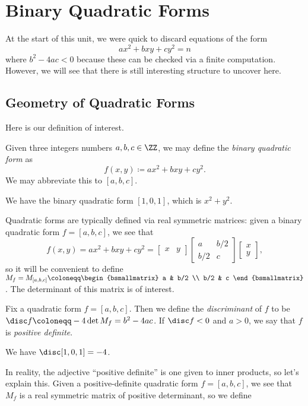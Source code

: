 \documentclass[../notes.tex]{subfiles}
\begin{document}
\section{Binary Quadratic Forms}

At the start of this unit, we were quick to discard equations of the form
\[ax^2+bxy+cy^2=n\]
where $b^2-4ac<0$ because these can be checked via a finite computation. However, we will see that there is still interesting structure to uncover here.

\subsection{Geometry of Quadratic Forms}
Here is our definition of interest.
\begin{definition}
	Given three integers numbers $a,b,c\in\ZZ$, we may define the \textit{binary quadratic form} as
	\[f(x,y)\coloneqq ax^2+bxy+cy^2.\]
	We may abbreviate this to $[a,b,c]$.
\end{definition}
\begin{example}
	We have the binary quadratic form $[1,0,1]$, which is $x^2+y^2$.
\end{example}
Quadratic forms are typically defined via real symmetric matrices: given a binary quadratic form $f=[a,b,c]$, we see that
\[f(x,y)=ax^2+bxy+cy^2=\begin{bmatrix}
	x & y
\end{bmatrix}\begin{bmatrix}
	a & b/2 \\
	b/2 & c
\end{bmatrix}\begin{bmatrix}
	x \\ y
\end{bmatrix},\]
so it will be convenient to define $M_f=M_{[a,b,c]}\coloneqq\begin{bsmallmatrix}
	a & b/2 \\ b/2 & c
\end{bsmallmatrix}$. The determinant of this matrix is of interest.
\begin{definition}[discriminant]
	Fix a quadratic form $f=[a,b,c]$. Then we define the \textit{discriminant} of $f$ to be $\disc f\coloneqq-4\det M_f=b^2-4ac$. If $\disc f<0$ and $a>0$, we say that $f$ is \textit{positive definite}.
\end{definition}
\begin{example}
	We have $\disc[1,0,1]=-4$.
\end{example}
In reality, the adjective ``positive definite'' is one given to inner products, so let's explain this. Given a pos\-itive-definite quadratic form $f=[a,b,c]$, we see that $M_f$ is a real symmetric matrix of positive determinant, so we define
\end{document}
